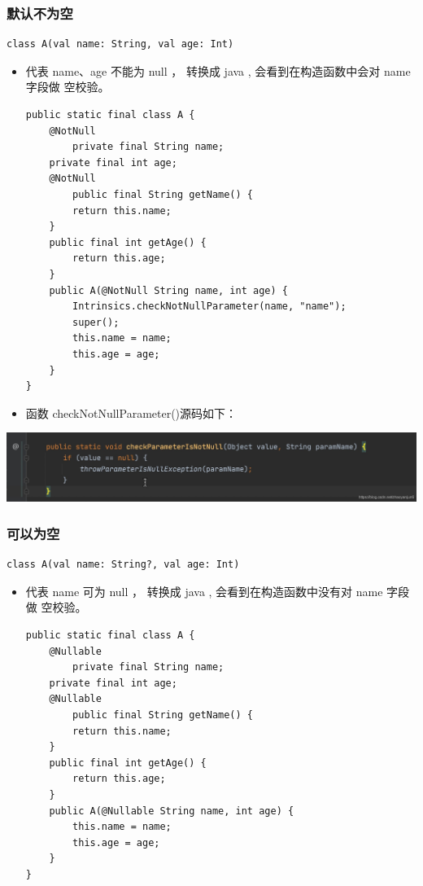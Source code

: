 \documentclass[9pt, b5paper]{article}
\begin{document}
\subsubsection{默认不为空}
\label{sec-6-4-1}
\begin{verbatim}
class A(val name: String, val age: Int)
\end{verbatim}
\begin{itemize}
\item 代表 name、age 不能为 null ， 转换成 java , 会看到在构造函数中会对 name 字段做 空校验。
\begin{verbatim}
public static final class A {
    @NotNull
        private final String name;
    private final int age;
    @NotNull
        public final String getName() {
        return this.name;
    }
    public final int getAge() {
        return this.age;
    }
    public A(@NotNull String name, int age) {
        Intrinsics.checkNotNullParameter(name, "name");
        super();
        this.name = name;
        this.age = age;
    }
}
\end{verbatim}
\item 函数 checkNotNullParameter()源码如下：
\end{itemize}

\includegraphics[width=.9\linewidth]{./pic/eg5.png}

\subsubsection{可以为空}
\label{sec-6-4-2}
\begin{verbatim}
class A(val name: String?, val age: Int)
\end{verbatim}
\begin{itemize}
\item 代表 name 可为 null ， 转换成 java , 会看到在构造函数中没有对 name 字段做 空校验。
\begin{verbatim}
public static final class A {
    @Nullable
        private final String name;
    private final int age;
    @Nullable
        public final String getName() {
        return this.name;
    }
    public final int getAge() {
        return this.age;
    }
    public A(@Nullable String name, int age) {
        this.name = name;
        this.age = age;
    }
}
\end{verbatim}
\end{itemize}
\end{document}
